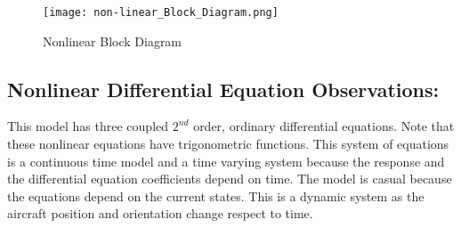 \documentclass[conference]{IEEEtran}
\begin{document}
\begin{figure}[!h]
\centerline{\texttt{[image: non-linear\_Block\_Diagram.png]}}
\caption{Nonlinear Block Diagram}
\label{figure}
\end{figure}

\subsection{Nonlinear Differential Equation Observations:}
This model has three coupled $2^{nd}$ order, ordinary differential equations. Note that these nonlinear equations have trigonometric functions. This system of equations is a continuous time model and a time varying system because the response and the differential equation coefficients depend on time. The model is casual because the equations depend on the current states. This is a dynamic system as the aircraft position and orientation change respect to time.\\ 
\end{document}
